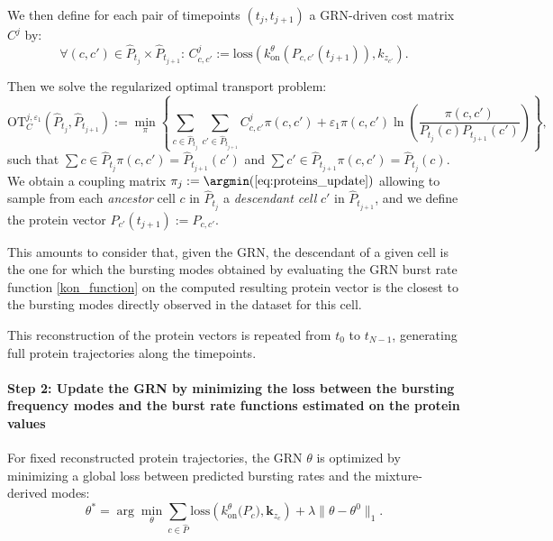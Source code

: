 We then define for each pair of timepoints $(t_j, t_{j+1})$ a GRN-driven cost matrix $C^{j}$  by:
\begin{equation}
    \label{cost_matrix}
    \forall (c, c') \in \widehat P_{t_j} \times \widehat P_{t_{j+1}}:\, C^j_{c, c'} := \mathrm{loss} (k_{\mathrm{on}}^\theta(P_{c,c'}(t_{j+1})) , k_{z_{c'}}).
\end{equation}

Then we solve the regularized optimal transport problem:
\begin{equation}
    \label{eq:proteins_update}
    \mathrm{OT}
_C^{j, \varepsilon_1}(\widehat P_{t_j}, \widehat P_{t_{j+1}}):= \min\limits_{\pi}\left\{\sum\limits_{{c \in \widehat P_{t_j}}} \sum\limits_{{c' \in \widehat P_{t_{j+1}}}} C^j_{c, c'} \pi(c, c') + \varepsilon_1 \pi(c, c') \ln\left(\frac{\pi(c, c')}{P_{t_{j}}(c) P_{t_{j+1}}(c')}\right)\right\},
\end{equation} 
such that $\sum\limits{c \in \widehat P_{t_j}}\pi(c, c') = \widehat P_{t_{j+1}}(c')$ and $\sum\limits{c' \in \widehat P_{t_{j+1}}}\pi(c, c') = \widehat P_{t_{j}}(c)$.
We obtain a coupling matrix $\pi_j:=\argmin(\ref{eq:proteins_update})$ allowing to sample from each \emph{ancestor} cell $c$ in $\widehat P_{t_j}$ a \emph{descendant cell} $c'$ in $\widehat P_{t_{j+1}}$, and we define the protein vector $P_{c'}(t_{j+1}) := P_{c,c'}$. 

This amounts to consider that, given the GRN, the descendant of a given cell is the one for which the bursting modes obtained by evaluating the GRN burst rate function \eqref{kon_function} on the computed resulting protein vector is the closest to the bursting modes directly observed in the dataset for this cell.

This reconstruction of the protein vectors is repeated from $t_0$ to $t_{N-1}$, generating full protein trajectories along the timepoints.


\paragraph{Step 2: Update the GRN by minimizing the loss between the bursting frequency modes and the burst rate functions estimated on the protein values}
\label{subsec:Trajectory_inference}

For fixed reconstructed protein trajectories, the GRN $\theta$ is optimized by
minimizing a global loss between predicted bursting
rates and the mixture-derived modes:
\begin{equation}
\theta^{\ast}
   = \arg\min_{\theta}
      \sum_{c \in \widehat P}
      \mathrm{loss}(
         k^{\theta}_{\mathrm{on}}\!\big(P_c\big)
         , \mathbf{k}_{z_c})
      + \lambda \|\theta - \theta^0\|_1.
\label{eq:GRN_update}
\end{equation}


